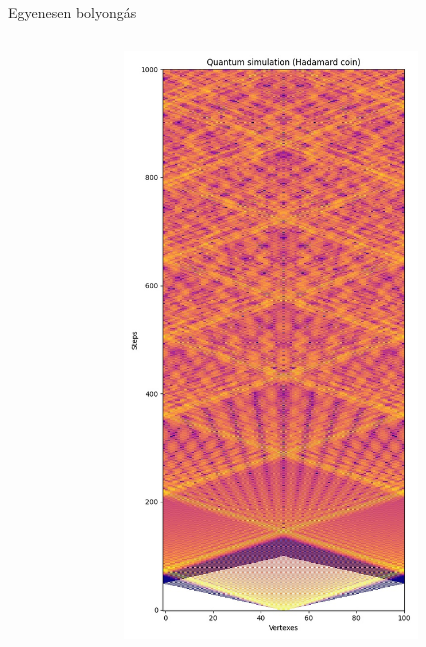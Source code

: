 \documentclass[aspectratio=169]{beamer}
\begin{document}
\begin{frame}{Egyenesen bolyongás}
\begin{columns}[onlytextwidth]
\begin{column}{.25\textwidth}
\begin{figure}
      \end{figure}
    \end{column}
    \begin{column}{.25\textwidth}
      \begin{figure}
        \includegraphics[width=0.9\textwidth]{./tdk_figures/results/path/hadamard.jpg}
      \end{figure}
    \end{column}
    \begin{column}{.25\textwidth}
    \end{column}
  \end{columns}
\end{frame}
\end{document}
